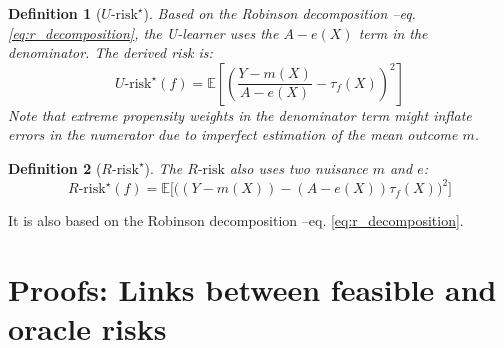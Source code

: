 \documentclass[unnumsec,webpdf,contemporary,large]{oup-authoring-template}%
\theoremstyle{thmstyleone}%
\theoremstyle{thmstyletwo}%
\theoremstyle{thmstylethree}%
\newtheorem{definition}{Definition}
\begin{document}
\begin{appendices}
    \begin{definition}[$U\text{-risk}^{\star}$]\label{def:u_risk}
        \cite{kunzel_metalearners_2019,nie_quasioracle_2017} Based on
        the Robinson decomposition --eq. \ref{eq:r_decomposition}, the U-learner
        uses the $A-e(X)$ term
        in the denominator. The derived risk is:
        \begin{equation*}
            U\text{-risk}^{\star}(f) =\mathbb{E}
            \left[
                \left( \frac{Y-m\left(X\right)}{A-e\left(X\right)} -
                \tau_f\left(X\right)\right)^{2} \right]
        \end{equation*}
        Note that extreme propensity weights in the
        denominator term might inflate errors in the numerator due to imperfect
        estimation of the mean outcome $m$.
    \end{definition}

    \begin{definition}[$R\text{-risk}^{\star}$]\label{def:r_risk}
        \cite{nie_quasioracle_2017,schuler_comparison_2018}
        The $R\text{-risk}$ also uses two nuisance $m$ and $e$:
        \begin{equation*}
            R\text{-risk}^{\star}(f) =\mathbb{E} \big[
                \big(\left(Y-m\left(X\right)\right) -\left(A-e\left(X\right)\right) \tau_f\left(X\right)\big)^{2} \big]
        \end{equation*}
    \end{definition}

    It is also based on the Robinson decomposition --eq. \ref{eq:r_decomposition}. %

    \section{Proofs: Links between feasible and oracle risks}\label{apd:proofs}




\end{appendices}
\end{document}
